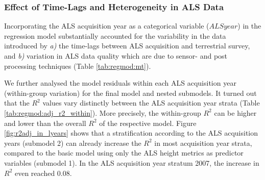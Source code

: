 \subsubsection*{Effect of Time-Lags and Heterogeneity in ALS Data}

Incorporating the ALS acquisition year as a categorical variable ($ALSyear$) in the regression model substantially accounted for the variability in the data introduced by \textit{a)} the time-lags between ALS acquisition and terrestrial survey, and \textit{b)} variation in ALS data quality which are due to sensor- and post processing techniques (Table \ref{tab:regmod:mt}). \par

We further analysed the model residuals within each ALS acquisition year (within-group variation) for the final model and nested submodels. It turned out that the $R^2$ values vary distinctly between the ALS acquisition year strata (Table \ref{tab:regmod:adj_r2_within}). More precisely, the within-group $R^2$ can be higher and lower than the overall $R^2$ of the respective model. Figure \ref{fig:r2adj_in_lyears} shows that a stratification according to the ALS acquisition years (submodel 2) can already increase the $R^2$ in most acquisition year strata, compared to the basic model using only the ALS height metrics as predictor variables (submodel 1). In the ALS acquisition year stratum 2007, the increase in $R^2$ even reached 0.08.



